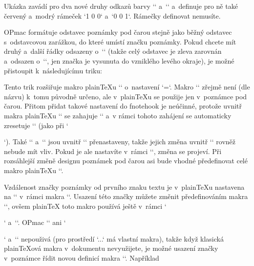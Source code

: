 {\def\fnxborder{1 0 0} 
\def\fnyborder{0 0 1} 
\endtt


Ukázka zavádí pro dva nové druhy odkazů barvy `\Red` a~`\Blue` a~definuje pro ně také červený a~modrý rámeček `\fnxborder` a~`\fnyborder`.  Rámečky definovat nemusíte.  


 


OPmac formátuje odstavec poznámky pod čarou stejně jako běžný odstavec s~odstavcovou zarážkou, do které umístí značku poznámky. Pokud chcete mít druhý a~další řádky odsazeny o~`\parindent` (takže celý odstavec je zleva zarovnán a~odsazen o~`\parindent`, jen značka je vysunuta do vzniklého levého okraje), je možné přistoupit k~následujícímu triku: 

\begtt
\addto\footstrut{\hang} 
\endtt


Tento trik rozšiřuje makro plainTeXu `\footstrut` o~nastavení `\hangindent=\parindent`. Makro `\footstrut` zřejmě není (dle názvu) k~tomu původně určeno, ale v~plainTeXu se použije jen v~poznámce pod čarou. Přitom přidat takové nastavení do {\tt{}}fnotehook je neúčinné, protože uvnitř makra plainTeXu `\vfootnote` se zahajuje `\insert` a~v rámci tohoto zahájení se automaticky zresetuje `\hangindent` (jako při `\par`). Také `\leftskip` a~`\rightskip` jsou uvnitř `\vfootnote` přenastaveny, takže jejich změna uvnitř `\fnotehook` rovněž nebude mít vliv. Pokud je ale nastavíte v~rámci `\footstrut`, změna se projeví. Při rozsáhlejší změně designu poznámek pod čarou asi bude vhodné předefinovat celé makro plainTeXu `\vfootnote`. 



Vzdálenost značky poznámky od prvního znaku textu je v~plainTeXu nastavena na `\enspace` v~rámci makra `\textindent`. Usazení této značky můžete změnit předefinováním makra `\textindent`, ovšem plainTeX toto makro používá ještě v~rámci `\item` a~`\itemitem`. OPmac `\texindent` ani `\item` a~`\itemitem` nepouživá (pro prostředí `\begitems...\enditems` má vlastní makra), takže když klasická plainTeXová makra v~dokumentu nevyužijete, je možné usazení značky v~poznámce řídit novou definicí makra `\textindent`. Například 

\begtt
\def\texindent#1{\indent\llap{#1\kern3pt}} 
\endtt

 


}
